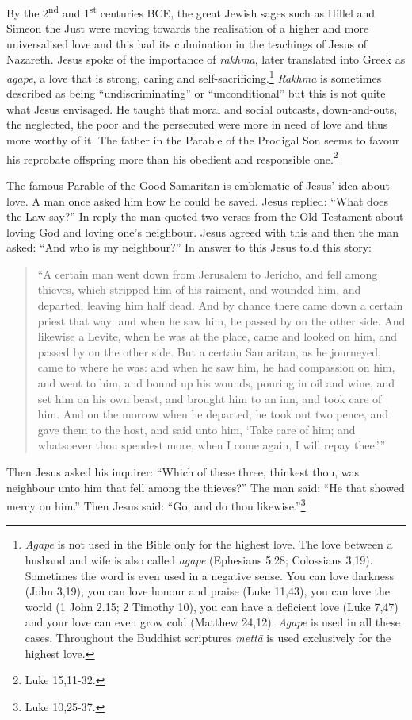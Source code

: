 \documentclass[10pt, openright]{book}
\begin{document}
By the 2\textsuperscript{nd} and 1\textsuperscript{st} centuries BCE, the great Jewish sages such as Hillel and Simeon the Just were moving towards the realisation of a higher and more universalised love and this had its culmination in the teachings of Jesus of Nazareth. Jesus spoke of the importance of \textit{rakhma}, later translated into Greek as \textit{agape}, a love that is strong, caring and self-sacrificing.\footnote {\textit{Agape} is not used in the Bible only for the highest love. The love between a husband and wife is also called \textit{agape} (Ephesians 5,28; Colossians 3,19). Sometimes the word is even used in a negative sense. You can love darkness (John 3,19), you can love honour and praise (Luke 11,43), you can love the world (1 John 2.15; 2 Timothy 10), you can have a deficient love (Luke 7,47) and your love can even grow cold (Matthew 24,12). \textit{Agape} is used in all these cases. Throughout the Buddhist scriptures \textit{mettā} is used exclusively for the highest love.} \textit{Rakhma} is sometimes described as being “undiscriminating” or “unconditional” but this is not quite what Jesus envisaged. He taught that moral and social outcasts, down-and-outs, the neglected, the poor and the persecuted were more in need of love and thus more worthy of it. The father in the Parable of the Prodigal Son seems to favour his reprobate offspring more than his obedient and responsible one.\footnote {Luke 15,11-32.}


The famous Parable of the Good Samaritan is emblematic of Jesus’ idea about love. A man once asked him how he could be saved. Jesus replied: “What does the Law say?” In reply the man quoted two verses from the Old Testament about loving God and loving one’s neighbour. Jesus agreed with this and then the man asked: “And who is my neighbour?” In answer to this Jesus told this story:


\begin{quote}

\hspace{-0.4em}“A certain man went down from Jerusalem to Jericho, and fell among thieves, which stripped him of his raiment, and wounded him, and departed, leaving him half dead. And by chance there came down a certain priest that way: and when he saw him, he passed by on the other side. And likewise a Levite, when he was at the place, came and looked on him, and passed by on the other side. But a certain Samaritan, as he journeyed, came to where he was: and when he saw him, he had compassion on him, and went to him, and bound up his wounds, pouring in oil and wine, and set him on his own beast, and brought him to an inn, and took care of him. And on the morrow when he departed, he took out two pence, and gave them to the host, and said unto him, ‘Take care of him; and whatsoever thou spendest more, when I come again, I will repay thee.’”


\end{quote}
Then Jesus asked his inquirer: “Which of these three, thinkest thou, was neighbour unto him that fell among the thieves?” The man said: “He that showed mercy on him.” Then Jesus said: “Go, and do thou likewise.”\footnote {Luke 10,25-37.}
\end{document}
